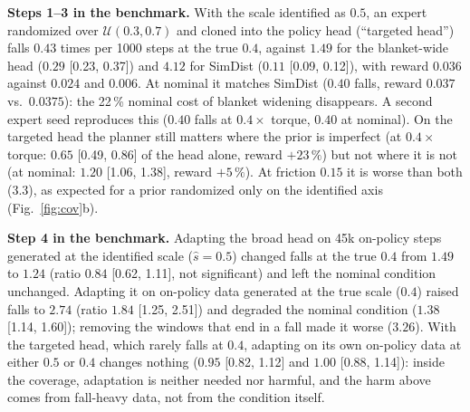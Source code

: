 \documentclass[conference]{IEEEtran}
\begin{document}
\textbf{Steps 1--3 in the benchmark.} With the scale identified as $0.5$, an expert randomized over $\mathcal{U}(0.3,0.7)$ and cloned into the policy head (``targeted head'') falls $0.43$ times per 1000 steps at the true $0.4$, against $1.49$ for the blanket-wide head ($0.29$ [0.23, 0.37]) and $4.12$ for SimDist ($0.11$ [0.09, 0.12]), with reward $0.036$ against $0.024$ and $0.006$. At nominal it matches SimDist ($0.40$ falls, reward $0.037$ vs.\ $0.0375$): the 22\,\% nominal cost of blanket widening disappears. A second expert seed reproduces this ($0.40$ falls at $0.4\times$ torque, $0.40$ at nominal). On the targeted head the planner still matters where the prior is imperfect (at $0.4\times$ torque: $0.65$ [0.49, 0.86] of the head alone, reward $+23\,\%$) but not where it is not (at nominal: $1.20$ [1.06, 1.38], reward $+5\,\%$). At friction $0.15$ it is worse than both ($3.3$), as expected for a prior randomized only on the identified axis (Fig.~\ref{fig:cov}b).

\textbf{Step 4 in the benchmark.} Adapting the broad head on 45k on-policy steps generated at the identified scale ($\hat s=0.5$) changed falls at the true $0.4$ from $1.49$ to $1.24$ (ratio $0.84$ [0.62, 1.11], not significant) and left the nominal condition unchanged. Adapting it on on-policy data generated at the true scale ($0.4$) raised falls to $2.74$ (ratio $1.84$ [1.25, 2.51]) and degraded the nominal condition ($1.38$ [1.14, 1.60]); removing the windows that end in a fall made it worse ($3.26$). With the targeted head, which rarely falls at $0.4$, adapting on its own on-policy data at either $0.5$ or $0.4$ changes nothing ($0.95$ [0.82, 1.12] and $1.00$ [0.88, 1.14]): inside the coverage, adaptation is neither needed nor harmful, and the harm above comes from fall-heavy data, not from the condition itself.
\end{document}
